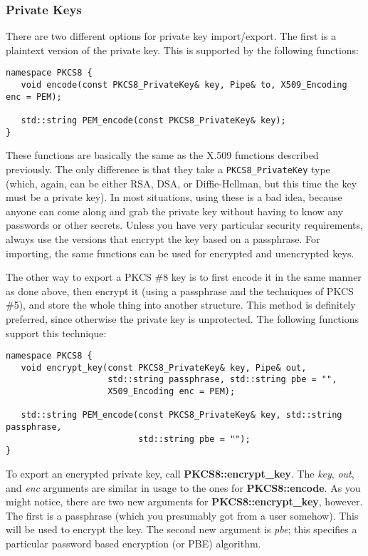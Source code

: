 \documentclass{article}
\newcommand{\function}[1]{\textbf{#1}}
\newcommand{\type}[1]{\texttt{#1}}
\renewcommand{\arg}[1]{\textsl{#1}}
\begin{document}
\subsubsection{Private Keys}

There are two different options for private key import/export. The first is a
plaintext version of the private key. This is supported by the following
functions:

\begin{verbatim}
namespace PKCS8 {
   void encode(const PKCS8_PrivateKey& key, Pipe& to, X509_Encoding enc = PEM);

   std::string PEM_encode(const PKCS8_PrivateKey& key);
}
\end{verbatim}

These functions are basically the same as the X.509 functions described
previously. The only difference is that they take a \type{PKCS8\_PrivateKey}
type (which, again, can be either RSA, DSA, or Diffie-Hellman, but this time
the key must be a private key). In most situations, using these is a bad idea,
because anyone can come along and grab the private key without having to know
any passwords or other secrets. Unless you have very particular security
requirements, always use the versions that encrypt the key based on a
passphrase. For importing, the same functions can be used for encrypted and
unencrypted keys.

The other way to export a PKCS \#8 key is to first encode it in the same manner
as done above, then encrypt it (using a passphrase and the techniques of PKCS
\#5), and store the whole thing into another structure. This method is
definitely preferred, since otherwise the private key is unprotected. The
following functions support this technique:

\begin{verbatim}
namespace PKCS8 {
   void encrypt_key(const PKCS8_PrivateKey& key, Pipe& out,
                    std::string passphrase, std::string pbe = "",
                    X509_Encoding enc = PEM);

   std::string PEM_encode(const PKCS8_PrivateKey& key, std::string passphrase,
                          std::string pbe = "");
}
\end{verbatim}

To export an encrypted private key, call \function{PKCS8::encrypt\_key}. The
\arg{key}, \arg{out}, and \arg{enc} arguments are similar in usage to the ones
for \function{PKCS8::encode}. As you might notice, there are two new arguments
for \function{PKCS8::encrypt\_key}, however. The first is a passphrase (which
you presumably got from a user somehow). This will be used to encrypt the key.
The second new argument is \arg{pbe}; this specifies a particular password
based encryption (or PBE) algorithm.
\end{document}

